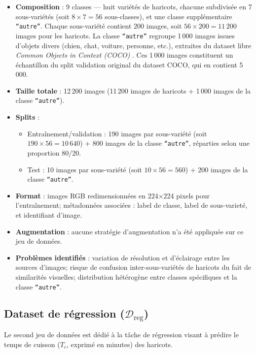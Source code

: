 \begin{itemize}
    \item \textbf{Composition} : 9 classes — huit variétés de haricots, chacune subdivisée en 7 sous-variétés (soit \(8 \times 7 = 56\) sous-classes), et une classe supplémentaire \texttt{``autre''}. Chaque sous-variété contient 200 images, soit \(56 \times 200 = 11\,200\) images pour les haricots. La classe \texttt{``autre''} regroupe 1\,000 images issues d’objets divers (chien, chat, voiture, personne, etc.), extraites du dataset libre \emph{Common Objects in Context (COCO)} \cite{lin2014microsoft}. Ces 1\,000 images constituent un échantillon du split validation original du dataset COCO, qui en contient 5\,000.
    \item \textbf{Taille totale} : 12\,200 images (11\,200 images de haricots + 1\,000 images de la classe \texttt{``autre''}).
    \item \textbf{Splits} : 
        \begin{itemize}
            \item Entraînement/validation : 190 images par sous-variété (soit \(190 \times 56 = 10\,640\)) + 800 images de la classe \texttt{``autre''}, réparties selon une proportion 80/20.
            \item Test : 10 images par sous-variété (soit \(10 \times 56 = 560\)) + 200 images de la classe \texttt{``autre''}.
        \end{itemize}
    \item \textbf{Format} : images RGB redimensionnées en 224×224 pixels pour l’entraînement; métadonnées associées : label de classe, label de sous-varieté, et identifiant d’image.
    \item \textbf{Augmentation} : aucune stratégie d’augmentation n’a été appliquée sur ce jeu de données.
    \item \textbf{Problèmes identifiés} : variation de résolution et d’éclairage entre les sources d’images; risque de confusion inter-sous-variétés de haricots du fait de similarités visuelles; distribution hétérogène entre classes spécifiques et la classe \texttt{``autre''}.
\end{itemize}


\subsection{Dataset de régression (\(\mathcal{D}_{\text{reg}}\))}

Le second jeu de données est dédié à la tâche de régression visant à prédire le temps de cuisson (\(T_c\), exprimé en minutes) des haricots.  

